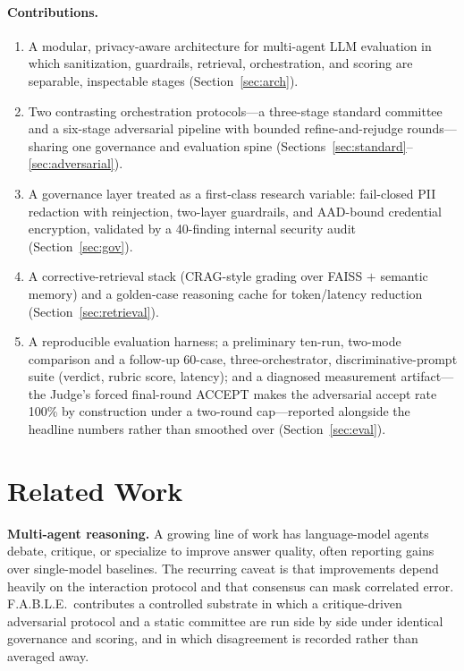 \documentclass{article}
\begin{document}
\paragraph{Contributions.}
\begin{enumerate}[leftmargin=1.6em, itemsep=2pt]
  \item A modular, privacy-aware architecture for multi-agent LLM evaluation in which
        sanitization, guardrails, retrieval, orchestration, and scoring are separable,
        inspectable stages (Section~\ref{sec:arch}).
  \item Two contrasting orchestration protocols---a three-stage standard committee and a
        six-stage adversarial pipeline with bounded refine-and-rejudge rounds---sharing one
        governance and evaluation spine (Sections~\ref{sec:standard}--\ref{sec:adversarial}).
  \item A governance layer treated as a first-class research variable: fail-closed PII
        redaction with reinjection, two-layer guardrails, and AAD-bound credential
        encryption, validated by a 40-finding internal security audit (Section~\ref{sec:gov}).
  \item A corrective-retrieval stack (CRAG-style grading over FAISS $+$ semantic memory) and
        a golden-case reasoning cache for token/latency reduction (Section~\ref{sec:retrieval}).
  \item A reproducible evaluation harness; a preliminary ten-run, two-mode comparison and a
        follow-up 60-case, three-orchestrator, discriminative-prompt suite (verdict, rubric
        score, latency); and a diagnosed measurement artifact---the Judge's forced final-round
        ACCEPT makes the adversarial accept rate 100\% by construction under a two-round
        cap---reported alongside the headline numbers rather than smoothed over
        (Section~\ref{sec:eval}).
\end{enumerate}

\section{Related Work}
\textbf{Multi-agent reasoning.} A growing line of work has language-model agents debate,
critique, or specialize to improve answer quality, often reporting gains over single-model
baselines. The recurring caveat is that improvements depend heavily on the interaction
protocol and that consensus can mask correlated error. F.A.B.L.E.\ contributes a controlled
substrate in which a critique-driven adversarial protocol and a static committee are run side
by side under identical governance and scoring, and in which disagreement is recorded rather
than averaged away.
\end{document}
